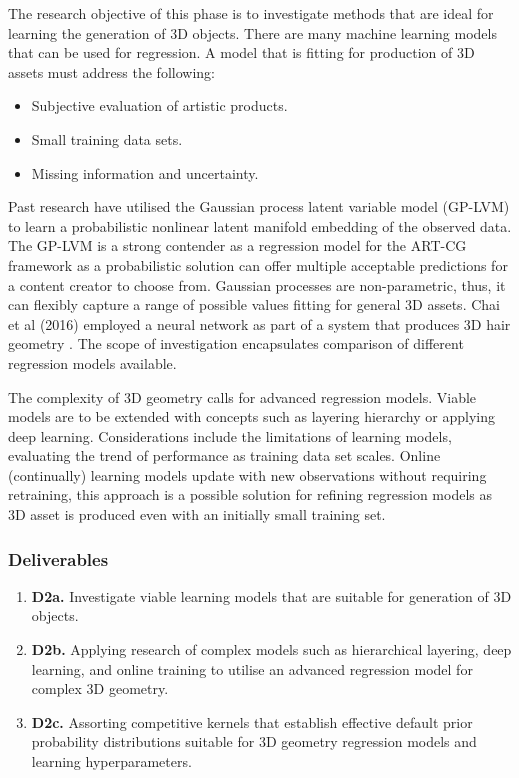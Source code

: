 \documentclass[a4paper, fontsize=15pt, onecolumn]{article} %
\numberwithin{equation}{section} %
\numberwithin{figure}{section} %
\numberwithin{table}{section} %
\begin{document}
The research objective of this phase is to investigate methods that are ideal for learning the generation of 3D objects. There are many machine learning models that can be used for regression. A model that is fitting for production of 3D assets must address the following:
\begin{itemize}
	\item Subjective evaluation of artistic products.
	\item Small training data sets.
	\item Missing information and uncertainty.
\end{itemize}

Past research have utilised the Gaussian process latent variable model (GP-LVM) to learn a probabilistic nonlinear latent manifold embedding of the observed data. The GP-LVM is a strong contender as a regression model for the ART-CG framework as a probabilistic solution can offer multiple acceptable predictions for a content creator to choose from. Gaussian processes are non-parametric, thus, it can flexibly capture a range of possible values fitting for general 3D assets. Chai et al (2016) employed a neural network as part of a system that produces 3D hair geometry \cite{autohair}. The scope of investigation encapsulates comparison of different regression models available.


The complexity of 3D geometry calls for advanced regression models. Viable models are to be extended with concepts such as layering hierarchy or applying deep learning. Considerations include the limitations of learning models, evaluating the trend of performance as training data set scales. Online (continually) learning models update with new observations without requiring retraining, this approach is a possible solution for refining regression models as 3D asset is produced even with an initially small training set.

\subsubsection{Deliverables} 
\begin{enumerate}
	\item \textbf{D2a.} Investigate viable learning models that are suitable for generation of 3D objects.
	\item \textbf{D2b.} Applying research of complex models such as hierarchical layering, deep learning, and online training to utilise an advanced regression model for complex 3D geometry.
	\item \textbf{D2c.} Assorting competitive kernels that establish effective default prior probability distributions suitable for 3D geometry regression models and learning hyperparameters.
\end{enumerate}
\end{document}

